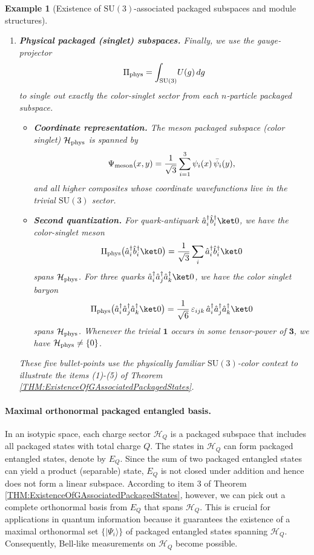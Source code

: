 \documentclass[12pt,a4paper]{article}
\newtheorem{example}{Example}
\begin{document}
\begin{example}[Existence of $\mathrm{SU}(3)$-associated packaged subspaces and module structures]
\begin{enumerate}
		
		\item \textbf{Physical packaged (singlet) subspaces.}
		Finally, we use the gauge‐projector		
		$$
		\Pi_{\rm phys}
		=\int_{\mathrm{SU}(3)}\!U(g)\,dg
		$$		
		to single out exactly the color‐singlet sector from each $n$‐particle packaged subspace.
		\begin{itemize}
			\item \textbf{Coordinate representation.}
			The meson packaged subspace (color singlet)
			$\mathcal H_{\rm phys}$ is spanned by
			$$
			\Psi_{\rm meson}(x,y)
			=\frac1{\sqrt3}\sum_{i=1}^3\psi_i(x)\,\bar\psi_i(y),
			$$
			and all higher composites whose coordinate wavefunctions live in the trivial $\mathrm{SU}(3)$ sector.
			
			\item \textbf{Second quantization.}
			For quark-antiquark $\hat a_i^\dagger\hat b_i^\dagger\ket0$, we have the color-singlet meson
			$$
			\Pi_{\rm phys}\bigl(\hat a_i^\dagger\hat b_i^\dagger\ket0\bigr)
			=
			\frac1{\sqrt3}\sum_i\hat a_i^\dagger\hat b_i^\dagger\ket0
			$$
			spans $\mathcal H_{\rm phys}$.			
			For three quarks $\hat a_i^\dagger\hat a_j^\dagger\hat a_k^\dagger\ket0$, we have the color singlet baryon
			$$
			\Pi_{\rm phys}\bigl(\hat a_i^\dagger\hat a_j^\dagger\hat a_k^\dagger\ket0\bigr)
			=
			\frac1{\sqrt6}\,\varepsilon_{ijk}\,\hat a_i^\dagger\hat a_j^\dagger\hat a_k^\dagger\ket0
			$$
			spans $\mathcal H_{\rm phys}$.
			Whenever the trivial $\mathbf1$ occurs in some tensor‐power of $\mathbf3$, we have $\mathcal H_{\rm phys}\neq\{0\}$.			
		\end{itemize}
		
		These five bullet-points use the physically familiar $\mathrm{SU}(3)$-color context to illustrate the items (1)-(5) of Theorem \ref{THM:ExistenceOfGAssociatedPackagedStates}.
	\end{enumerate}
\end{example}


\paragraph{Maximal orthonormal packaged entangled basis.}
In an isotypic space, each charge sector $\mathcal{H}_Q$ is a packaged subspace that includes all packaged states with total charge $Q$.
The states in $\mathcal{H}_Q$ can form packaged entangled states, denote by $E_Q$.  
Since the sum of two packaged entangled states can yield a product (separable) state, $E_Q$ is not closed under addition and hence does not form a linear subspace.
According to item 3 of Theorem \ref{THM:ExistenceOfGAssociatedPackagedStates}, however, we can pick out a complete orthonormal basis from $E_Q$ that spans $\mathcal{H}_Q$.
This is crucial for applications in quantum information because it guarantees the existence of a maximal orthonormal set $\{\lvert \Psi_i\rangle\}$ of packaged entangled states spanning $\mathcal{H}_Q$.  
Consequently, Bell-like measurements on $\mathcal{H}_Q$ become possible.
\end{document}

